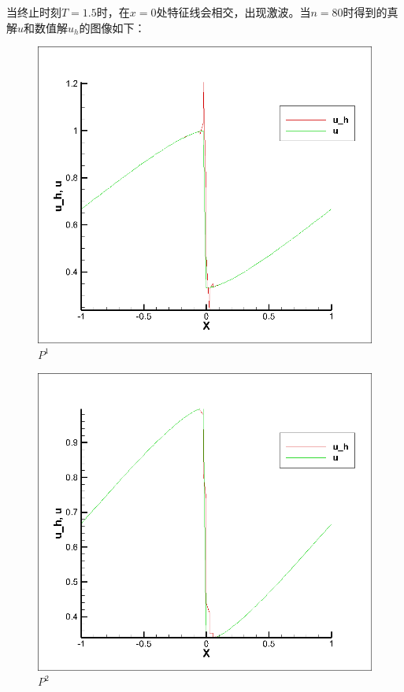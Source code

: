 \documentclass[12pt, a4paper]{ctexart}
\begin{document}
	当终止时刻$T = 1.5$时，在$x=0$处特征线会相交，出现激波。当$n=80$时得到的真解$u$和数值解$u_h$的图像如下：
	\begin{figure}[htbp]
		\centering
		\caption{$P^1$}
		\includegraphics[width=15cm]{P1.png}
	\end{figure}
	\begin{figure}[htbp]
		\centering
		\caption{$P^2$}
		\includegraphics[width=15cm]{1.5.png}
	\end{figure}
\end{document}
